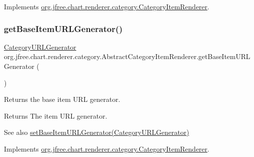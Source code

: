 Implements \mbox{\hyperlink{interfaceorg_1_1jfree_1_1chart_1_1renderer_1_1category_1_1_category_item_renderer_aa30e54bde9b1b02438519b9d11644ec4}{org.\+jfree.\+chart.\+renderer.\+category.\+Category\+Item\+Renderer}}.

\mbox{\label{classorg_1_1jfree_1_1chart_1_1renderer_1_1category_1_1_abstract_category_item_renderer_ac9003c1ec9ad1cc03e1beecca61e6bf1}} 
\subsubsection{\texorpdfstring{get\+Base\+Item\+U\+R\+L\+Generator()}{getBaseItemURLGenerator()}}
{\footnotesize\ttfamily \mbox{\hyperlink{interfaceorg_1_1jfree_1_1chart_1_1urls_1_1_category_u_r_l_generator}{Category\+U\+R\+L\+Generator}} org.\+jfree.\+chart.\+renderer.\+category.\+Abstract\+Category\+Item\+Renderer.\+get\+Base\+Item\+U\+R\+L\+Generator (\begin{DoxyParamCaption}{ }\end{DoxyParamCaption})}

Returns the base item U\+RL generator.

\begin{DoxyReturn}{Returns}
The item U\+RL generator.
\end{DoxyReturn}
\begin{DoxySeeAlso}{See also}
\mbox{\hyperlink{classorg_1_1jfree_1_1chart_1_1renderer_1_1category_1_1_abstract_category_item_renderer_a5164152d258bec58dcd516d7293e6ce8}{set\+Base\+Item\+U\+R\+L\+Generator(\+Category\+U\+R\+L\+Generator)}} 
\end{DoxySeeAlso}


Implements \mbox{\hyperlink{interfaceorg_1_1jfree_1_1chart_1_1renderer_1_1category_1_1_category_item_renderer_a87008cf9d5718483e89d13b93521d1c2}{org.\+jfree.\+chart.\+renderer.\+category.\+Category\+Item\+Renderer}}.

